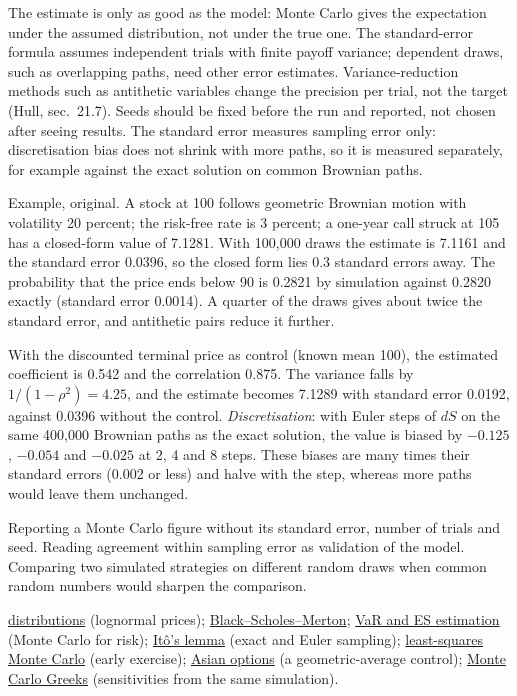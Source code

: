 \begin{qfmethod}
 The estimate is only as good as the model: Monte Carlo gives the expectation under the assumed distribution, not under the true one. The standard-error formula assumes independent trials with finite payoff variance; dependent draws, such as overlapping paths, need other error estimates. Variance-reduction methods such as antithetic variables change the precision per trial, not the target (Hull, sec.~21.7). Seeds should be fixed before the run and reported, not chosen after seeing results. The standard error measures sampling error only: discretisation bias does not shrink with more paths, so it is measured separately, for example against the exact solution on common Brownian paths.

 Example, original. A stock at 100 follows geometric Brownian motion with volatility 20 percent; the risk-free rate is 3 percent; a one-year call struck at 105 has a closed-form value of 7.1281. With 100{,}000 draws the estimate is 7.1161 and the standard error 0.0396, so the closed form lies 0.3 standard errors away. The probability that the price ends below 90 is 0.2821 by simulation against 0.2820 exactly (standard error 0.0014). A quarter of the draws gives about twice the standard error, and antithetic pairs reduce it further.

With the discounted terminal price as control (known mean 100), the estimated coefficient is 0.542 and the correlation 0.875. The variance falls by $1/(1-\rho^2)=4.25$, and the estimate becomes 7.1289 with standard error 0.0192, against 0.0396 without the control. \emph{Discretisation}: with Euler steps of $dS$ on the same 400{,}000 Brownian paths as the exact solution, the value is biased by $-0.125$, $-0.054$ and $-0.025$ at 2, 4 and 8 steps. These biases are many times their standard errors (0.002 or less) and halve with the step, whereas more paths would leave them unchanged.

 Reporting a Monte Carlo figure without its standard error, number of trials and seed. Reading agreement within sampling error as validation of the model. Comparing two simulated strategies on different random draws when common random numbers would sharpen the comparison.

 \hyperref[def:financial-distributions]{distributions} (lognormal prices); \hyperref[mod:black-scholes-merton]{Black--Scholes--Merton}; \hyperref[meth:var-es-estimation-methods]{VaR and ES estimation} (Monte Carlo for risk); \hyperref[res:ito-lemma-geometric-brownian-motion]{It\^o's lemma} (exact and Euler sampling); \hyperref[meth:least-squares-monte-carlo]{least-squares Monte Carlo} (early exercise); \hyperref[meth:asian-option-valuation]{Asian options} (a geometric-average control); \hyperref[meth:monte-carlo-greeks]{Monte Carlo Greeks} (sensitivities from the same simulation).

\end{qfmethod}

